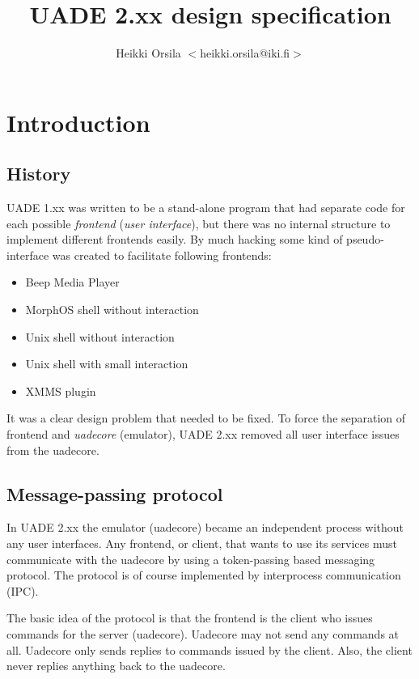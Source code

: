 \documentclass{article}
\begin{document}
\title{UADE 2.xx design specification}
\author{Heikki Orsila $<$heikki.orsila@iki.fi$>$}
\date{}
\maketitle

\section{Introduction}

\subsection{History}

UADE 1.xx was written to be a stand-alone program that had separate code
for each possible \emph{frontend} (\emph{user interface}), but there was
no internal structure to implement different frontends easily. By much
hacking some kind of pseudo-interface was created to facilitate following
frontends:
\begin{itemize}
  \item Beep Media Player
  \item MorphOS shell without interaction
  \item Unix shell without interaction
  \item Unix shell with small interaction
  \item XMMS plugin
\end{itemize}

It was a clear design problem that needed to be fixed. To force the separation
of frontend and \emph{uadecore} (emulator), UADE 2.xx removed all user
interface issues from the uadecore.

\subsection{Message-passing protocol}
In UADE 2.xx the emulator (uadecore) became an independent process without
any user interfaces. Any frontend, or client, that wants to use its services
must communicate with the uadecore by using a token-passing based messaging
protocol. The protocol is of course implemented by interprocess communication
(IPC).

The basic idea of the protocol is that the frontend is the client
who issues commands for the server (uadecore). Uadecore may not send any
commands at all. Uadecore only sends replies to commands issued by the
client. Also, the client never replies anything back to the
uadecore.
\end{document}
